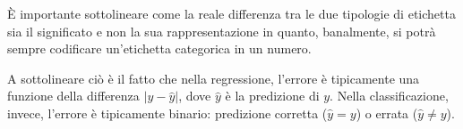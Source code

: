 \documentclass[a4paper]{article}
\begin{document}
È importante sottolineare come la reale differenza tra le due tipologie di etichetta sia il
significato e non la sua rappresentazione in quanto, banalmente, si potrà sempre codificare
un'etichetta categorica in un numero.

A sottolineare ciò è il fatto che nella regressione, l'errore è tipicamente una funzione della
differenza $| y-\hat{y} |$, dove $\hat{y}$ è la predizione di $y$. Nella classificazione, invece,
l'errore è tipicamente binario: predizione corretta ($\hat{y}=y$) o errata ($\hat{y}\neq y$).
\end{document}

